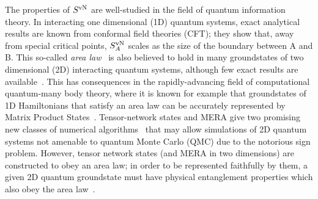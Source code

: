 \documentclass[prl,aps,twocolumn,floatfix,amsmath,amssymb,superscriptaddress,tightenlines]{revtex4}
\begin{document}
The properties of $S^{ \rm vN}$ are well-studied in the field of quantum information theory.
In interacting one dimensional (1D) quantum systems, exact analytical results are known from conformal
field theories (CFT); they show that, away from special critical points,
$S^{ \rm vN}_A$ scales as the size of the boundary between A and B.
This so-called {\it area law}~\cite{Shredder} is also believed to hold in many
groundstates of two dimensional (2D) interacting quantum systems,
although few exact results are available~\cite{ALreview}.  This has 
consequences in the
rapidly-advancing field of computational quantum-many body theory, where
it is known for example that groundstates of 1D Hamiltonians that satisfy an area law
can be accurately represented by Matrix Product States~\cite{MPS_DMRG}.
Tensor-network states and MERA give two promising new classes of numerical
algorithms~\cite{PEPS1,MERA} 
that may allow simulations of 2D quantum systems not amenable to quantum Monte Carlo (QMC) due to
the notorious sign problem.  However, tensor network states (and MERA in two dimensions)
are constructed to obey an area law; in order to be represented faithfully
by them, a given 2D quantum groundstate must have physical entanglement
properties which also obey the area law~\cite{ALreview}.


\end{document}
